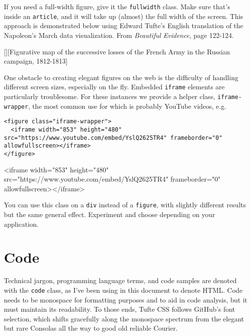 \documentclass{article}
\begin{document}
If you need a full-width figure, give it the \texttt{fullwidth} class. Make sure that’s inside an \texttt{article}, and it will take up (almost) the full width of the screen. This approach is demonstrated below using Edward Tufte’s English translation of the Napoleon’s March data visualization. From \emph{Beautiful Evidence}, page 122-124.

[][Figurative map of the successive losses of the French Army in the Russian campaign, 1812-1813]

One obstacle to creating elegant figures on the web is the difficulty of handling different screen sizes, especially on the fly. Embedded \texttt{iframe} elements are particularly troublesome. For these instances we provide a helper class, \texttt{iframe-wrapper}, the most common use for which is probably YouTube videos, e.g.
\begin{verbatim}
<figure class="iframe-wrapper">
  <iframe width="853" height="480" src="https://www.youtube.com/embed/YslQ2625TR4" frameborder="0" allowfullscreen></iframe>
</figure>
\end{verbatim}

\begin{tuftecssIframeWrapper}
<iframe width="853" height="480" src="https://www.youtube.com/embed/YslQ2625TR4" frameborder="0" allowfullscreen></iframe>
\end{tuftecssIframeWrapper}

You can use this class on a \texttt{div} instead of a \texttt{figure}, with slightly different results but the same general effect. Experiment and choose depending on your application.

\section{Code}
Technical jargon, programming language terms, and code samples are denoted with the \texttt{code} class, as I’ve been using in this document to denote HTML. Code needs to be monospace for formatting purposes and to aid in code analysis, but it must maintain its readability. To those ends, Tufte CSS follows GitHub’s font selection, which shifts gracefully along the monospace spectrum from the elegant but rare Consolas all the way to good old reliable Courier.
\end{document}
